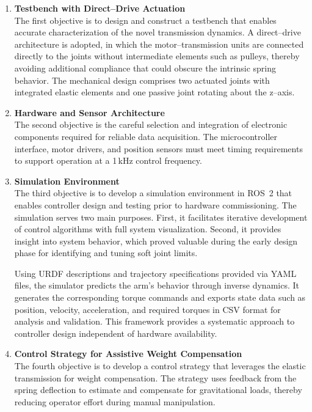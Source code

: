 \documentclass[11pt,a4paper,twoside,openright]{book}
\begin{document}
\begin{enumerate}
    \item \textbf{Testbench with Direct--Drive Actuation}\\
    The first objective is to design and construct a testbench that enables accurate characterization of the novel transmission dynamics. A direct--drive architecture is adopted, in which the motor--transmission units are connected directly to the joints without intermediate elements such as pulleys, thereby avoiding additional compliance that could obscure the intrinsic spring behavior. The mechanical design comprises two actuated joints with integrated elastic elements and one passive joint rotating about the z--axis.

    \item \textbf{Hardware and Sensor Architecture}\\
    The second objective is the careful selection and integration of electronic components required for reliable data acquisition. The microcontroller interface, motor drivers, and position sensors must meet timing requirements to support operation at a 1\,kHz control frequency.
    
    \item \textbf{Simulation Environment}\\
    The third objective is to develop a simulation environment in ROS~2 that enables controller design and testing prior to hardware commissioning. The simulation serves two main purposes. First, it facilitates iterative development of control algorithms with full system visualization. Second, it provides insight into system behavior, which proved valuable during the early design phase for identifying and tuning soft joint limits.

    Using URDF descriptions and trajectory specifications provided via YAML files, the simulator predicts the arm's behavior through inverse dynamics. It generates the corresponding torque commands and exports state data such as position, velocity, acceleration, and required torques in CSV format for analysis and validation. This framework provides a systematic approach to controller design independent of hardware availability.

    \item \textbf{Control Strategy for Assistive Weight Compensation}\\
    The fourth objective is to develop a control strategy that leverages the elastic transmission for weight compensation. The strategy uses feedback from the spring deflection to estimate and compensate for gravitational loads, thereby reducing operator effort during manual manipulation.
\end{enumerate}
\end{document}
